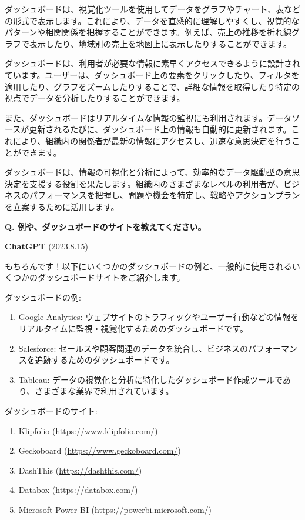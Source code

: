 \documentclass[
  xelatex, ja=standard]{bxjsbook}
\theoremstyle{definition}
\theoremstyle{definition}
\theoremstyle{definition}
\theoremstyle{definition}
\theoremstyle{remark}
\begin{document}
ダッシュボードは、視覚化ツールを使用してデータをグラフやチャート、表などの形式で表示します。これにより、データを直感的に理解しやすくし、視覚的なパターンや相関関係を把握することができます。例えば、売上の推移を折れ線グラフで表示したり、地域別の売上を地図上に表示したりすることができます。

ダッシュボードは、利用者が必要な情報に素早くアクセスできるように設計されています。ユーザーは、ダッシュボード上の要素をクリックしたり、フィルタを適用したり、グラフをズームしたりすることで、詳細な情報を取得したり特定の視点でデータを分析したりすることができます。

また、ダッシュボードはリアルタイムな情報の監視にも利用されます。データソースが更新されるたびに、ダッシュボード上の情報も自動的に更新されます。これにより、組織内の関係者が最新の情報にアクセスし、迅速な意思決定を行うことができます。

ダッシュボードは、情報の可視化と分析によって、効率的なデータ駆動型の意思決定を支援する役割を果たします。組織内のさまざまなレベルの利用者が、ビジネスのパフォーマンスを把握し、問題や機会を特定し、戦略やアクションプランを立案するために活用します。

\textbf{Q. 例や、ダッシュボードのサイトを教えてください。}

\textbf{ChatGPT} (2023.8.15)

もちろんです！以下にいくつかのダッシュボードの例と、一般的に使用されるいくつかのダッシュボードサイトをご紹介します。

ダッシュボードの例:

\begin{enumerate}
\def\labelenumi{\arabic{enumi}.}
\item
  Google Analytics: ウェブサイトのトラフィックやユーザー行動などの情報をリアルタイムに監視・視覚化するためのダッシュボードです。
\item
  Salesforce: セールスや顧客関連のデータを統合し、ビジネスのパフォーマンスを追跡するためのダッシュボードです。
\item
  Tableau: データの視覚化と分析に特化したダッシュボード作成ツールであり、さまざまな業界で利用されています。
\end{enumerate}

ダッシュボードのサイト:

\begin{enumerate}
\def\labelenumi{\arabic{enumi}.}
\item
  Klipfolio (\url{https://www.klipfolio.com/})
\item
  Geckoboard (\url{https://www.geckoboard.com/})
\item
  DashThis (\url{https://dashthis.com/})
\item
  Databox (\url{https://databox.com/})
\item
  Microsoft Power BI (\url{https://powerbi.microsoft.com/})
\end{enumerate}
\end{document}
